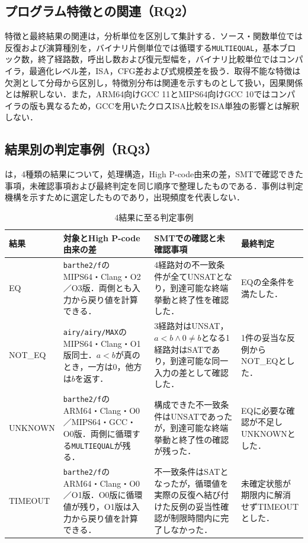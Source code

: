 \subsection{プログラム特徴との関連（RQ2）}
特徴と最終結果の関連は，分析単位を区別して集計する．ソース・関数単位では反復および演算種別を，バイナリ片側単位では循環する\texttt{MULTIEQUAL}，基本ブロック数，終了経路数，呼出し数および復元型幅を，バイナリ比較単位ではコンパイラ，最適化レベル差，ISA，CFG差および式規模差を扱う．取得不能な特徴は欠測として分母から区別し，特徴別分布は関連を示すものとして扱い，因果関係とは解釈しない．また，ARM64向けGCC 11とMIPS64向けGCC 10ではコンパイラの版も異なるため，GCCを用いたクロスISA比較をISA単独の影響とは解釈しない．

\subsection{結果別の判定事例（RQ3）}
は，4種類の結果について，処理構造，High P-code由来の差，SMTで確認できた事項，未確認事項および最終判定を同じ順序で整理したものである．事例は判定機構を示すために選定したものであり，出現頻度を代表しない．

\begin{table}[t]
\centering
\caption{4結果に至る判定事例}
\label{tab:outcome-mechanisms}
\footnotesize
\setlength{\tabcolsep}{1.2pt}
\begin{tabular}{@{}p{17mm}p{50mm}p{62mm}p{35mm}@{}}
\hline\hline
\textbf{結果} & \textbf{対象とHigh P-code由来の差} & \textbf{SMTでの確認と未確認事項} & \textbf{最終判定} \\
\hline
EQ & \texttt{barthe2/f}のMIPS64・Clang・O2／O3版．両側とも入力から戻り値を計算できる． & 4経路対の不一致条件が全てUNSATとなり，到達可能な終端挙動と終了性を確認した． & EQの全条件を満たした． \\
NOT\_EQ & \texttt{airy/airy/MAX}のMIPS64・Clang・O1版同士．$a<b$が真のとき，一方は0，他方は$b$を返す． & 3経路対はUNSAT，$a<b\land 0\neq b$となる1経路対はSATであり，到達可能な同一入力の差として確認した． & 1件の妥当な反例からNOT\_EQとした． \\
UNKNOWN & \texttt{barthe2/f}のARM64・Clang・O0／MIPS64・GCC・O0版．両側に循環する\texttt{MULTIEQUAL}が残る． & 構成できた不一致条件はUNSATであったが，到達可能な終端挙動と終了性の確認が残った． & EQに必要な確認が不足しUNKNOWNとした． \\
TIMEOUT & \texttt{barthe2/f}のARM64・Clang・O0／O1版．O0版に循環値が残り，O1版は入力から戻り値を計算できる． & 不一致条件はSATとなったが，循環値を実際の反復へ結び付けた反例の妥当性確認が制限時間内に完了しなかった． & 未確定状態が期限内に解消せずTIMEOUTとした． \\
\hline
\end{tabular}
\end{table}

